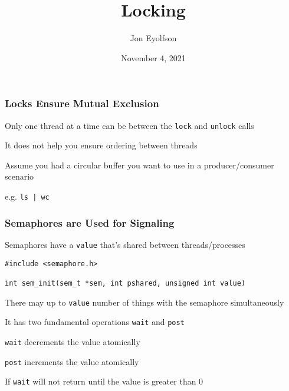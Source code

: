 

\title{Locking}
\author{Jon Eyolfson}
\date{November 4, 2021}


  \begin{frame}
    \titlepage
  \end{frame}

  \begin{frame}
    \frametitle{Locks Ensure Mutual Exclusion}

    Only one thread at a time can be between the \texttt{lock} and
    \texttt{unlock} calls

    \vspace{2em}

    It does not help you ensure ordering between threads

    \vspace{2em}

    Assume you had a circular buffer you want to use in a producer/consumer
    scenario

    \hspace{2em} e.g. \texttt{ls | wc}
  \end{frame}

  \begin{frame}[fragile]
    \frametitle{Semaphores are Used for Signaling}

    Semaphores have a {\tt value} that's shared between threads/processes

    \vspace{2em}

    \begin{lstlisting}
#include <semaphore.h>

int sem_init(sem_t *sem, int pshared, unsigned int value)
    \end{lstlisting}

    \vspace{2em}

    There may up to \texttt{value} number of things with the semaphore
    simultaneously

    \vspace{2em}

    It has two fundamental operations {\tt wait} and {\tt post}

    \hspace{2em} \texttt{wait} decrements the value atomically

    \hspace{2em} \texttt{post} increments the value atomically

    \vspace{2em}

    If \texttt{wait} will not return until the value is greater than 0
  \end{frame}

